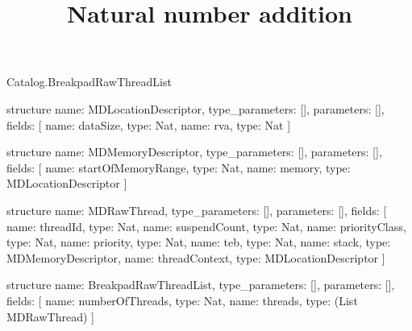 \begin{lexlean}{Catalog.BreakpadRawThreadList}
\title{Natural number addition}
\begin{semanticmodule}
structure{
  name: MDLocationDescriptor,
  type_parameters: [],
  parameters: [],
  fields: [
    {name: dataSize, type: Nat},
    {name: rva, type: Nat}
  ]
}

structure{
  name: MDMemoryDescriptor,
  type_parameters: [],
  parameters: [],
  fields: [
    {name: startOfMemoryRange, type: Nat},
    {name: memory, type: MDLocationDescriptor}
  ]
}

structure{
  name: MDRawThread,
  type_parameters: [],
  parameters: [],
  fields: [
    {name: threadId, type: Nat},
    {name: suspendCount, type: Nat},
    {name: priorityClass, type: Nat},
    {name: priority, type: Nat},
    {name: teb, type: Nat},
    {name: stack, type: MDMemoryDescriptor},
    {name: threadContext, type: MDLocationDescriptor}
  ]
}

structure{
  name: BreakpadRawThreadList,
  type_parameters: [],
  parameters: [],
  fields: [
    {name: numberOfThreads, type: Nat},
    {name: threads, type: (List MDRawThread)}
  ]
}
\end{semanticmodule}
\end{lexlean}
